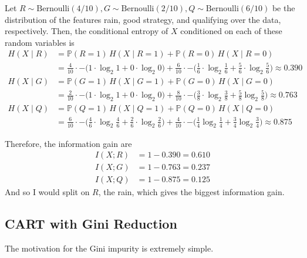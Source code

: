 \begin{example}
    Let $R \sim \mathrm{Bernoulli}(4/10), G \sim \mathrm{Bernoulli}(2/10), Q \sim \mathrm{Bernoulli}(6/10)$ be the distribution of the features rain, good strategy, and qualifying over the data, respectively. Then, the conditional entropy of $X$ conditioned on each of these random variables is 
    \begin{align*}
      H(X \mid R) & = \mathbb{P}(R = 1)\, H(X \mid R = 1) + \mathbb{P}(R = 0) \, H(X \mid R = 0) \\
      & = \frac{4}{10} \cdot - \big( 1 \cdot \log_2 1 + 0 \cdot \log_2 0 \big) + \frac{6}{10} \cdot - \big( \frac{1}{6} \cdot \log_2 \frac{1}{6} + \frac{5}{6} \cdot \log_2 \frac{5}{6} \big) \approx 0.390 \\
      H(X \mid G) & =  \mathbb{P}(G = 1)\, H(X \mid G = 1) + \mathbb{P}(G = 0) \, H(X \mid G = 0) \\
      & = \frac{2}{10} \cdot - \big( 1 \cdot \log_2 1 + 0 \cdot \log_2 0 \big) + \frac{8}{10} \cdot - \big( \frac{3}{8} \cdot \log_2 \frac{3}{8} + \frac{5}{8} \log_2 \frac{5}{8} \big) \approx 0.763\\
      H(X \mid Q ) & = \mathbb{P}(Q = 1)\, H(X \mid Q = 1) + \mathbb{P}(Q = 0) \, H(X \mid Q = 0) \\
      & = \frac{6}{10} \cdot - \big( \frac{4}{6} \cdot \log_2 \frac{4}{6} + \frac{2}{6} \cdot \log_2 \frac{2}{6} \big) + \frac{4}{10} \cdot - \big( \frac{1}{4} \log_2 \frac{1}{4} + \frac{3}{4} \log_2 \frac{3}{4} \big) \approx 0.875
    \end{align*}

    Therefore, the information gain are 
    \begin{align*}
        I(X; R) & = 1 - 0.390 = 0.610 \\
        I(X; G) & = 1 - 0.763 = 0.237 \\
        I(X; Q) & = 1 - 0.875 = 0.125 
    \end{align*}
    And so I would split on $R$, the rain, which gives the biggest information gain. 
  \end{example}

\subsection{CART with Gini Reduction} 

  The motivation for the Gini impurity is extremely simple. 

